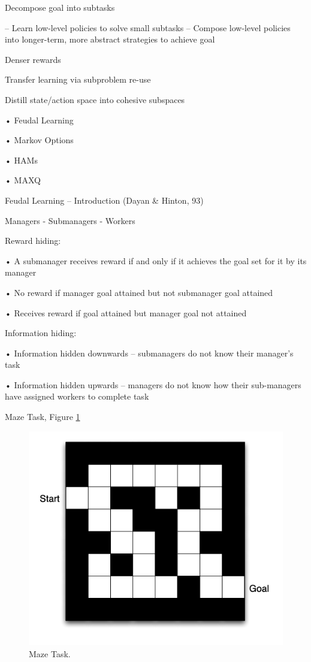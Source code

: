 \documentclass[english]{article}
\begin{document}
Decompose goal into subtasks

– Learn low-level policies to solve small subtasks
– Compose low-level policies into longer-term, more abstract
strategies to achieve goal
\benum 
\item  Denser rewards
\item  Transfer learning via subproblem re-use
\item  Distill state/action space into cohesive subspaces

\eenum

\item  
• Feudal Learning

• Markov Options

• HAMs

• MAXQ

\item Feudal Learning – Introduction   (Dayan \& Hinton, 93)

Managers - Submanagers - Workers

\benum 
\item  
Reward hiding: 

•  A submanager receives reward
if and only if it achieves the
goal set for it by its manager

• No reward if manager goal
attained but not submanager
goal attained

• Receives reward if goal
attained but manager goal not
attained

\item  
Information hiding: 

• Information hidden
downwards – submanagers do
not know their manager's task

• Information hidden upwards –
managers do not know how
their sub-managers have
assigned workers to complete
task

\item  Maze Task, Figure \ref{maze10}

  \begin{figure}
        \centering
        \includegraphics[scale = 0.35]{maze.PNG}
        
        \caption{Maze Task.}
        \label{maze10}
    \end{figure}
\end{document}
